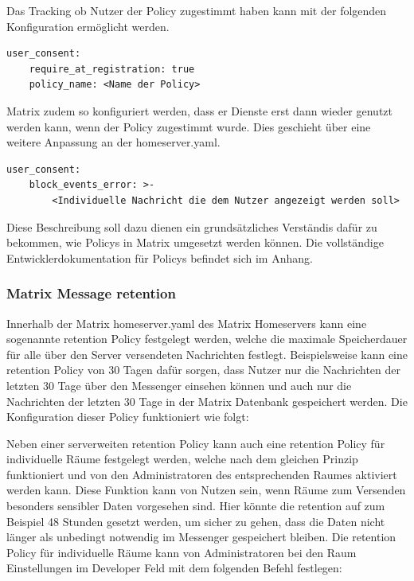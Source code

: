 Das Tracking ob Nutzer der Policy zugestimmt haben kann mit der folgenden Konfiguration ermöglicht werden.

\begin{lstlisting}
user_consent:
    require_at_registration: true
    policy_name: <Name der Policy>
\end{lstlisting}

Matrix zudem so konfiguriert werden, dass er Dienste erst dann wieder genutzt werden kann, wenn der Policy zugestimmt wurde.
Dies geschieht über eine weitere Anpassung an der homeserver.yaml.

\begin{lstlisting}
user_consent:
    block_events_error: >-
        <Individuelle Nachricht die dem Nutzer angezeigt werden soll>
\end{lstlisting}

Diese Beschreibung soll dazu dienen ein grundsätzliches Verständis dafür zu bekommen, wie Policys in Matrix umgesetzt werden können. Die vollständige Entwicklerdokumentation für Policys befindet sich im Anhang.

\subsubsection{Matrix Message retention}\label{chapter:vdmf}
Innerhalb der Matrix homeserver.yaml des Matrix Homeservers kann eine sogenannte retention Policy festgelegt werden, welche die maximale Speicherdauer für alle über den Server versendeten Nachrichten festlegt. Beispielsweise kann eine retention Policy von 30 Tagen dafür sorgen, dass Nutzer nur die Nachrichten der letzten 30 Tage über den Messenger einsehen können und auch nur die Nachrichten der letzten 30 Tage in der Matrix Datenbank gespeichert werden. Die Konfiguration dieser Policy funktioniert wie folgt:

Neben einer serverweiten retention Policy kann auch eine retention Policy für individuelle Räume festgelegt werden, welche nach dem gleichen Prinzip funktioniert und von den Administratoren des entsprechenden Raumes aktiviert werden kann. Diese Funktion kann von Nutzen sein, wenn Räume zum Versenden besonders sensibler Daten vorgesehen sind. Hier könnte die retention auf zum Beispiel 48 Stunden gesetzt werden, um sicher zu gehen, dass die Daten nicht länger als unbedingt notwendig im Messenger gespeichert bleiben. Die retention Policy für individuelle Räume kann von Administratoren bei den Raum Einstellungen im Developer Feld mit dem folgenden Befehl festlegen:

